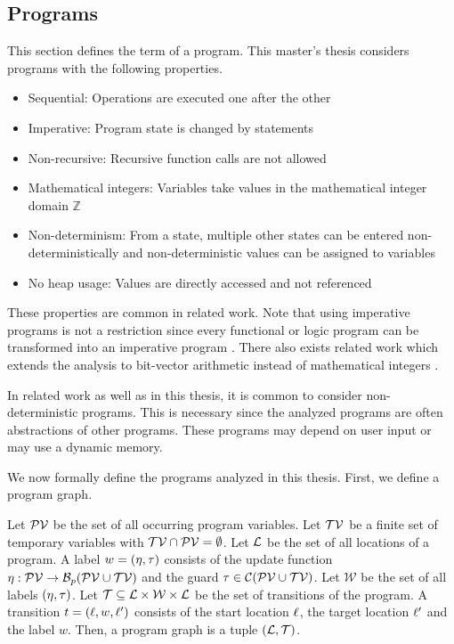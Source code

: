 \subsection{Programs}

This section defines the term of a program.
This master's thesis considers programs with the following properties.

\begin{itemize}
\item Sequential: Operations are executed one after the other
\item Imperative: Program state is changed by statements
\item Non-recursive: Recursive function calls are not allowed
\item Mathematical integers: Variables take values in the mathematical integer domain $\mathbb{Z}$
\item Non-determinism: From a state, multiple other states can be entered non-deterministically and non-deterministic values can be assigned to variables
\item No heap usage: Values are directly accessed and not referenced
\end{itemize}

These properties are common in related work.
Note that using imperative programs is not a restriction since every functional or logic program can be transformed into an imperative program \cite{equivalence_of_languages}.
There also exists related work which extends the analysis to bit-vector arithmetic instead of mathematical integers \cite{bitvectorarithmetic}.

In related work as well as in this thesis, it is common to consider non-deterministic programs.
This is necessary since the analyzed programs are often abstractions of other programs.
These programs may depend on user input or may use a dynamic memory.

We now formally define the programs analyzed in this thesis.
First, we define a program graph.

\begin{definition} 
  Let $\mathcal{PV}$ be the set of all occurring program variables.
  Let $\mathcal{TV}$ be a finite set of temporary variables with $\mathcal{TV} \cap \mathcal{PV} = \emptyset$.
  Let $\mathcal{L}$ be the set of all locations of a program.
  A label $w = (\eta, \tau)$ consists of the update function $\eta: \mathcal{PV} \rightarrow \mathcal{B}_p(\mathcal{PV} \cup \mathcal{TV})$ and the guard $\tau \in \mathcal{C}(\mathcal{PV} \cup \mathcal{TV})$.
  Let $\mathcal{W}$ be the set of all labels $(\eta, \tau)$.
  Let $\mathcal{T} \subseteq \mathcal{L} \times \mathcal{W} \times \mathcal{L}$ be the set of transitions of the program.
  A transition $t = (\ell, w, \ell')$ consists of the start location $\ell$, the target location $\ell'$ and the label $w$.
  Then, a program graph is a tuple $(\mathcal{L}, \mathcal{T})$.
\end{definition}

